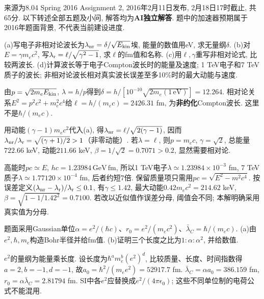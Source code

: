 来源为8.04 Spring 2016 Assignment 2, 2016年2月11日发布, 2月18日17时截止, 共65分. 以下转述全部五题及小问, 解答均为\textbf{AI独立解答}. 题中的加速器预期属于2016年题面背景, 不代表当前建设进度.
\begin{exercise}
(a)写电子非相对论波长为$\lambda_{\rm nr}=\delta/\sqrt{E_{\rm kin}}$埃, 能量的数值用eV, 求无量纲$\delta$. (b)对$E=\gamma m_ec^2$, 写$\lambda_{\rm r}=\ell/\sqrt{\gamma^2-1}$, 求$\ell$的fm值和名称. (c)用$\ell,\gamma$重写非相对论式, 比较两波长. (d)计算波长等于电子Compton波长时的能量及速度; 1 TeV电子和7 TeV质子的波长; 非相对论波长相对真实波长误差至多10\%时的最大动能与速度.
\end{exercise}
\begin{solution}
由$p=\sqrt{2m_eE_{\rm kin}}$, $\lambda=h/p$得到$\delta=h/[10^{-10}\sqrt{2m_e(1\,\mathrm{eV})}]=12.264$. 相对论关系$E^2=p^2c^2+m_e^2c^4$给$\ell=h/(m_ec)=2426.31$ fm, 为\textbf{非约化}Compton波长. 这里不是$\hbar/(m_ec)$.

用动能$(\gamma-1)m_ec^2$代入(a), 得$\lambda_{\rm nr}=\ell/\sqrt{2(\gamma-1)}$, 因而$\lambda_{\rm nr}/\lambda_{\rm r}=\sqrt{(\gamma+1)/2}>1$（非零动能）. 若$\lambda=\ell$, 则$p=m_ec$, $\gamma=\sqrt2$, 总能量$722.66$ keV, 动能$211.66$ keV, $\beta=1/\sqrt2=0.7071>0.2$, 显然需要相对论.

高能时$pc\simeq E$, $hc=1.23984\,\mathrm{GeV\,fm}$, 所以1 TeV电子$\lambda\simeq1.23984\times10^{-3}$ fm, 7 TeV质子$\lambda\simeq1.77120\times10^{-4}$ fm, 后者约短7倍. 保留质量项只需用$pc=\sqrt{E^2-m^2c^4}$. 按误差定义$(\lambda_{\rm nr}-\lambda_{\rm r})/\lambda_{\rm r}\leq0.1$, 有$\gamma\leq1.42$, 最大动能$0.42m_ec^2=214.62$ keV, $\beta=\sqrt{1-1/1.42^2}=0.7100$. 若改以近似值作误差分母, 阈值会不同; 本解明确采用真实值为分母.
\end{solution}
\begin{exercise}
题面采用Gaussian单位$\alpha=e^2/(\hbar c)$、$r_0=e^2/(m_ec^2)$、$\bar\lambda_C=\hbar/(m_ec)$. (a)由$e^2,\hbar,m_e$构造Bohr半径并给fm值. (b)证明三个长度之比为$1:\alpha:\alpha^2$, 并给数值.
\end{exercise}
\begin{solution}
$e^2$的量纲为能量乘长度. 设长度为$\hbar^a m_e^b(e^2)^d$, 比较质量、长度、时间指数得$a=2,b=-1,d=-1$, 故$a_0=\hbar^2/(m_ee^2)=52917.7$ fm. $\bar\lambda_C=\alpha a_0=386.159$ fm, $r_0=\alpha\bar\lambda_C=2.81794$ fm. SI中各$e^2$应替换成$e^2/(4\pi\epsilon_0)$; 这些不同单位制的电荷公式不能混用.
\end{solution}
